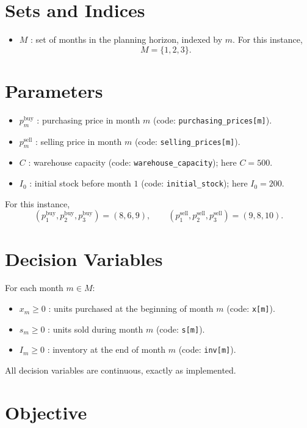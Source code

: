 \section*{Sets and Indices}

\begin{itemize}
    \item $M$ : set of months in the planning horizon, indexed by $m$. For this instance,
    \[
    M=\{1,2,3\}.
    \]
\end{itemize}

\section*{Parameters}

\begin{itemize}
    \item $p_m^{\text{buy}}$ : purchasing price in month $m$ (code: \texttt{purchasing\_prices[m]}).
    \item $p_m^{\text{sell}}$ : selling price in month $m$ (code: \texttt{selling\_prices[m]}).
    \item $C$ : warehouse capacity (code: \texttt{warehouse\_capacity}); here $C=500$.
    \item $I_0$ : initial stock before month $1$ (code: \texttt{initial\_stock}); here $I_0=200$.
\end{itemize}

For this instance,
\[
(p_1^{\text{buy}},p_2^{\text{buy}},p_3^{\text{buy}})=(8,6,9),
\qquad
(p_1^{\text{sell}},p_2^{\text{sell}},p_3^{\text{sell}})=(9,8,10).
\]

\section*{Decision Variables}

For each month $m \in M$:
\begin{itemize}
    \item $x_m \ge 0$ : units purchased at the beginning of month $m$ (code: \texttt{x[m]}).
    \item $s_m \ge 0$ : units sold during month $m$ (code: \texttt{s[m]}).
    \item $I_m \ge 0$ : inventory at the end of month $m$ (code: \texttt{inv[m]}).
\end{itemize}

All decision variables are continuous, exactly as implemented.

\section*{Objective}

